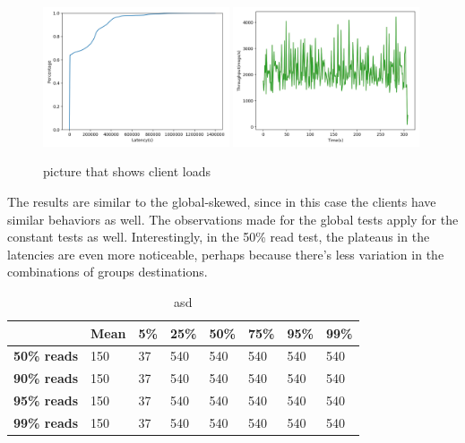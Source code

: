 \begin{figure}[!htb]
  \centering
  \includegraphics[width=0.49\textwidth,height=\textheight,keepaspectratio]{img/constant1_lat.png}
  \includegraphics[width=0.49\textwidth,height=\textheight,keepaspectratio]{img/constant1_tp.png}
  \caption{ picture that shows client loads }
  \label{fig:constant1-performance}
\end{figure}

The results are similar to the global-skewed, since in this case the clients have similar behaviors as well. The observations made for the global tests apply for the constant tests as well. Interestingly, in the 50\% read test, the plateaus in the latencies are even more noticeable, perhaps because there's less variation in the combinations of groups destinations.

\begin{table}[!htb]
  \centering
  \begin{tabular}{l l l l l l l l}
    \hline
    & \textbf{Mean} & \textbf{5\%} & \textbf{25\%} & \textbf{50\%} & \textbf{75\%} & \textbf{95\%}& \textbf{99\%} \\
    \hline
    \textbf{50\% reads} & 150 & 37 & 540 & 540 & 540 & 540 & 540 \\
    \textbf{90\% reads} & 150 & 37 & 540 & 540 & 540 & 540 & 540 \\
    \textbf{95\% reads} & 150 & 37 & 540 & 540 & 540 & 540 & 540 \\
    \textbf{99\% reads} & 150 & 37 & 540 & 540 & 540 & 540 & 540 \\
    \hline
  \end{tabular}
  \caption{asd}\label{tab:constant-latencies-table}
\end{table}

